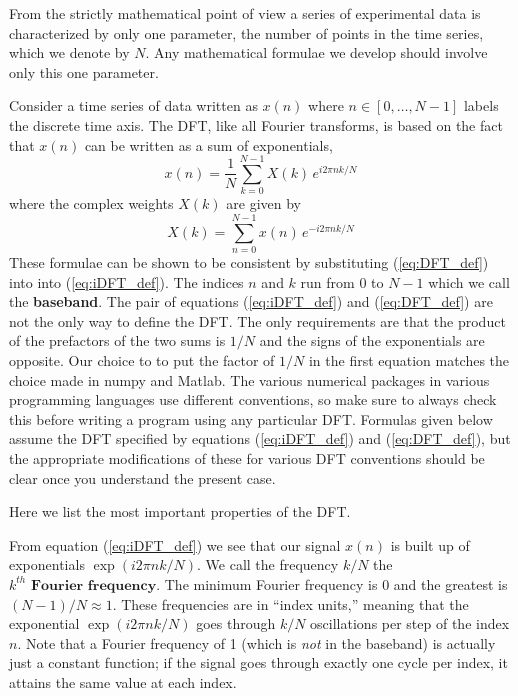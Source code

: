 
From the strictly mathematical point of view a series of experimental data is characterized by only one parameter, the number of points in the time series, which we denote by $N$.
Any mathematical formulae we develop should involve only this one parameter.


Consider a time series of data written as $x(n)$ where $n \in [0,\dots,N-1]$ labels the discrete time axis.
The DFT, like all Fourier transforms, is based on the fact that $x(n)$ can be written as a sum of exponentials,
\begin{equation}
x(n)=\frac{1}{N}\sum_{k=0}^{N-1}X(k)\, e^{i2\pi nk/N} \label{eq:iDFT_def}
\end{equation}
where the complex weights $X(k)$ are given by
\begin{equation}
X(k)=\sum_{n=0}^{N-1}x(n)\, e^{-i2\pi nk/N} \label{eq:DFT_def}
\end{equation}
These formulae can be shown to be consistent by substituting (\ref{eq:DFT_def}) into  into (\ref{eq:iDFT_def}).
The indices $n$ and $k$ run from $0$ to $N-1$ which we call the \textbf{baseband}.
The pair of equations (\ref{eq:iDFT_def}) and (\ref{eq:DFT_def}) are not the only way to define the DFT.
The only requirements are that the product of the prefactors of the two sums is $1/N$ and the signs of the exponentials are opposite.
Our choice to to put the factor of $1/N$ in the first equation matches the choice made in numpy and Matlab.
The various numerical packages in various programming languages use different conventions, so make sure to always check this before writing a program using any particular DFT.
Formulas given below assume the DFT specified by equations (\ref{eq:iDFT_def}) and (\ref{eq:DFT_def}), but the appropriate modifications of these for various DFT conventions should be clear once you understand the present case.



Here we list the most important properties of the DFT.


From equation (\ref{eq:iDFT_def}) we see that our signal $x(n)$ is built up of exponentials $\exp(i2\pi nk/N)$.
We call the frequency $k/N$ the $k^{th}\textbf{ Fourier frequency}$.
The minimum Fourier frequency is 0 and the greatest is $(N-1)/N\approx1$.
These frequencies are in ``index units,'' meaning that the exponential $\exp(i 2 \pi n k / N)$ goes through $k/N$ oscillations per step of the index $n$.
Note that a Fourier frequency of 1 (which is \emph{not} in the baseband) is actually just a constant function; if the signal goes through exactly one cycle per index, it attains the same value at each index.



